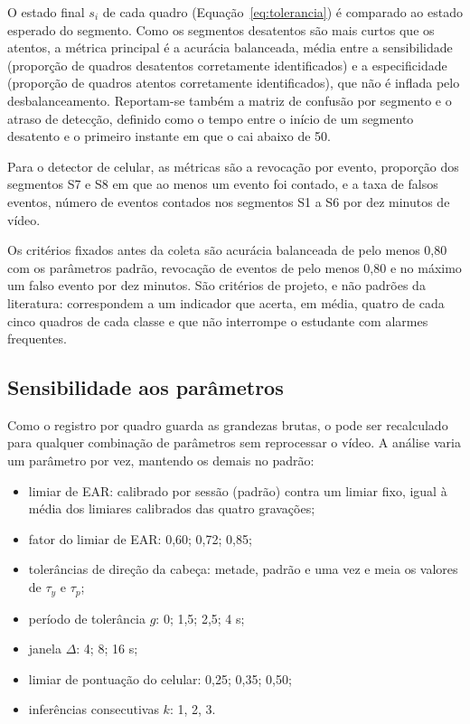 O estado final $s_i$ de cada quadro (Equação~\ref{eq:tolerancia}) é comparado ao estado esperado do segmento. Como os segmentos desatentos são mais curtos que os atentos, a métrica principal é a acurácia balanceada, média entre a sensibilidade (proporção de quadros desatentos corretamente identificados) e a especificidade (proporção de quadros atentos corretamente identificados), que não é inflada pelo desbalanceamento. Reportam-se também a matriz de confusão por segmento e o atraso de detecção, definido como o tempo entre o início de um segmento desatento e o primeiro instante em que o \fs cai abaixo de 50.

Para o detector de celular, as métricas são a revocação por evento, proporção dos segmentos S7 e S8 em que ao menos um evento foi contado, e a taxa de falsos eventos, número de eventos contados nos segmentos S1 a S6 por dez minutos de vídeo.

Os critérios fixados antes da coleta são acurácia balanceada de pelo menos 0,80 com os parâmetros padrão, revocação de eventos de pelo menos 0,80 e no máximo um falso evento por dez minutos. São critérios de projeto, e não padrões da literatura: correspondem a um indicador que acerta, em média, quatro de cada cinco quadros de cada classe e que não interrompe o estudante com alarmes frequentes.

\subsection{Sensibilidade aos parâmetros}

Como o registro por quadro guarda as grandezas brutas, o \fs pode ser recalculado para qualquer combinação de parâmetros sem reprocessar o vídeo. A análise varia um parâmetro por vez, mantendo os demais no padrão:

\begin{itemize}
  \item limiar de EAR: calibrado por sessão (padrão) contra um limiar fixo, igual à média dos limiares calibrados das quatro gravações;
  \item fator do limiar de EAR: 0,60; 0,72; 0,85;
  \item tolerâncias de direção da cabeça: metade, padrão e uma vez e meia os valores de $\tau_y$ e $\tau_p$;
  \item período de tolerância $g$: 0; 1,5; 2,5; 4 s;
  \item janela $\Delta$: 4; 8; 16 s;
  \item limiar de pontuação do celular: 0,25; 0,35; 0,50;
  \item inferências consecutivas $k$: 1, 2, 3.
\end{itemize}


